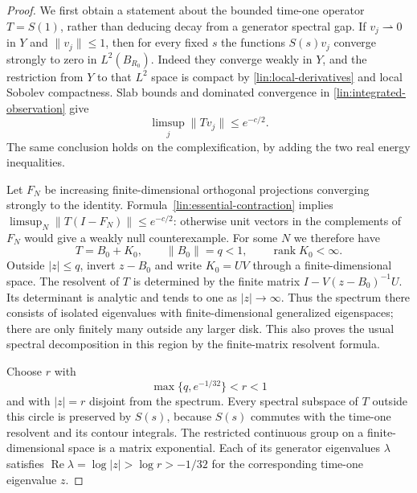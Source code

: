 \documentclass[11pt]{article}
\numberwithin{equation}{section}
\theoremstyle{definition}
\theoremstyle{remark}
\begin{document}
\begin{proof}
We first obtain a statement about the bounded time-one operator
$T=S(1)$, rather than deducing decay from a generator spectral gap.
If $v_j\rightharpoonup0$ in $Y$ and $\|v_j\|\le1$, then for every fixed
$s$ the functions $S(s)v_j$ converge strongly to zero in
$L^2(B_{R_0})$.  Indeed they converge weakly in $Y$, and the restriction
from $Y$ to that $L^2$ space is compact by
\eqref{lin:local-derivatives} and local Sobolev compactness.  Slab bounds
and dominated convergence in \eqref{lin:integrated-observation} give
\begin{equation}\label{lin:essential-contraction}
 \limsup_j\|Tv_j\|\le e^{-c/2}.
\end{equation}
The same conclusion holds on the complexification, by adding the two
real energy inequalities.

Let $F_N$ be increasing finite-dimensional orthogonal projections
converging strongly to the identity.  Formula~\eqref{lin:essential-contraction}
implies $\limsup_N\|T(I-F_N)\|\le e^{-c/2}$: otherwise unit vectors
in the complements of $F_N$ would give a weakly null counterexample.
For some $N$ we therefore have
\[
 T=B_0+K_0,\qquad \|B_0\|=q<1,\qquad \operatorname{rank}K_0<\infty.
\]
Outside $|z|\le q$, invert $z-B_0$ and write
$K_0=UV$ through a finite-dimensional space.  The resolvent of $T$
is determined by the finite matrix
$I-V(z-B_0)^{-1}U$.  Its determinant is analytic and tends to one as
$|z|\to\infty$.  Thus the spectrum there consists of isolated
eigenvalues with finite-dimensional generalized eigenspaces; there
are only finitely many outside any larger disk.  This also proves the
usual spectral decomposition in this region by the finite-matrix
resolvent formula.

Choose $r$ with
\[
 \max\{q,e^{-1/32}\}<r<1
\]
and with $|z|=r$ disjoint from the spectrum.  Every spectral subspace
of $T$ outside this circle is preserved by $S(s)$, because $S(s)$
commutes with the time-one resolvent and its contour integrals.
The restricted continuous group on a finite-dimensional space is a
matrix exponential.  Each of its generator eigenvalues $\lambda$
satisfies $\operatorname{Re}\lambda=\log|z|>\log r>-1/32$ for the corresponding
time-one eigenvalue $z$.


\end{proof}
\end{document}
